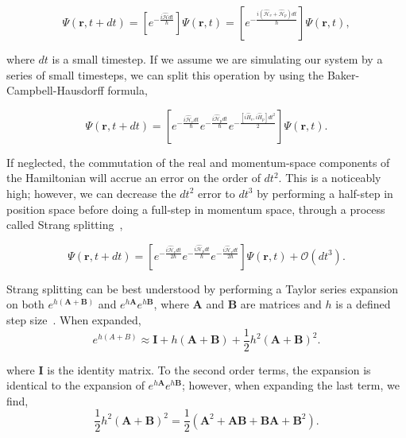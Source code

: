 \begin{equation}
\Psi(\mathbf{r},t + dt) = \left[e^{-\frac{i\mathcal{\hat{H}}dt}{\hbar}}\right]\Psi(\mathbf{r},t) = \left[e^{-\frac{i(\mathcal{\hat{H}}_v + \mathcal{\hat{H}}_p)dt}{\hbar}}\right]\Psi(\mathbf{r},t),
\end{equation}

\noindent where $dt$ is a small timestep.
If we assume we are simulating our system by a series of small timesteps, we can split this operation by using the Baker-Campbell-Hausdorff formula,

\begin{equation}
\Psi(\mathbf{r},t+dt) = \left[e^{-\frac{i\mathcal{\hat{H}}_vdt}{\hbar}}e^{-\frac{i\mathcal{\hat{H}}_pdt}{\hbar}}e^{-\frac{[i\hat{H}_v, i\hat{H}_p]dt^2}{2}}\right]\Psi(\mathbf{r},t).
\label{eqn:rsolve}
\end{equation}

\noindent If neglected, the commutation of the real and momentum-space components of the Hamiltonian will accrue an error on the order of $dt^2$.
This is a noticeably high;
however, we can decrease the $dt^2$ error to $dt^3$ by performing a half-step in position space before doing a full-step in momentum space, through a process called Strang splitting~\cite{strang1968},

\begin{equation}
\Psi(\mathbf{r},t+dt) = \left[e^{-\frac{i\mathcal{\hat{H}}_vdt}{2\hbar}}e^{-\frac{i\mathcal{\hat{H}}_pdt}{\hbar}}e^{-\frac{i\mathcal{\hat{H}}_vdt}{2\hbar}} \right]\Psi(\mathbf{r},t) + \mathcal{O}(dt^3).
\end{equation}

Strang splitting can be best understood by performing a Taylor series expansion on both $e^{h(\mathbf{A}+\mathbf{B})}$ and $e^{h\mathbf{A}}e^{h\mathbf{B}}$, where $\mathbf{A}$ and $\mathbf{B}$ are matrices and $h$ is a defined step size~\cite{macnamara2016}.
When expanded,
\begin{equation}
e^{h(A+B)} \approx \mathbf{I} + h(\mathbf{A} + \mathbf{B}) + \frac{1}{2}h^2(\mathbf{A} + \mathbf{B})^2.
\end{equation}

\noindent where $\mathbf{I}$ is the identity matrix.
To the second order terms, the expansion is identical to the expansion of $e^{h\mathbf{A}}e^{h\mathbf{B}}$; however, when expanding the last term, we find,
\begin{equation}
\frac{1}{2}h^2(\mathbf{A} + \mathbf{B})^2 = \frac{1}{2}\left( \mathbf{A}^2 + \mathbf{AB} + \mathbf{BA} + \mathbf{B}^2\right).
\end{equation}

